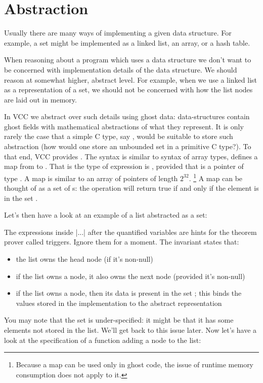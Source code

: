 \section{Abstraction}

Usually there are many ways of implementing a given data structure.
For example, a set might be implemented as a linked list, an array, or a hash table.

When reasoning about a program which uses a data structure we don't want to be
concerned with implementation details of the data structure.
We should reason at somewhat higher, abstract level.
For example, when we use a linked list as a representation of a set, we should not be concerned
with how the list nodes are laid out in memory.

In VCC we abstract over such details using ghost data: data-structures contain ghost fields with mathematical
abstractions of what they represent.
It is only rarely the case that a simple C type, say , would be suitable
to store such abstraction (how would one store an unbounded set in a primitive C type?).
To that end, VCC provides .
The syntax is similar to syntax of array types,  defines a map  from 
to .
That is the type of expression  is , provided that  is a pointer
of type .
A map  is similar to an array of pointers of length $2^{32}$.%
\footnote{
  Because a map can be used only in ghost code, 
  the issue of runtime memory consumption does not apply to it.}
A map  can be thought of as a set of s: the operation
 will return true if and only if the element  is in the set .

Let's then have a look at an example of a list abstracted as a set:


\noindent
The expressions inside \vcc|{...}| after the quantified variables are hints for
the theorem prover called triggers. Ignore them for a moment.
The invariant states that:
\begin{itemize}
\item the list owns the head node (if it's non-null)
\item if the list owns a node, it also owns the next node (provided it's non-null)
\item if the list owns a node, then its data is present in the set ;
      this binds the values stored in the implementation to the abstract representation
\end{itemize}
You may note that the set  is under-specified: 
it might be that it has some elements not stored in the list.
We'll get back to this issue later.
Now let's have a look at the specification of a function adding a
node to the list:

